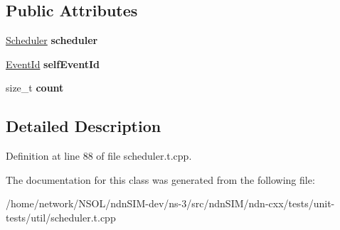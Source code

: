 \subsection*{Public Attributes}
\begin{DoxyCompactItemize}
\item 
\hyperlink{classndn_1_1util_1_1scheduler_1_1Scheduler}{Scheduler} {\bfseries scheduler}\hypertarget{classndn_1_1util_1_1scheduler_1_1tests_1_1SelfRescheduleFixture_a22e0eb1d7ebe87b27ef55a4a594a9df4}{}\label{classndn_1_1util_1_1scheduler_1_1tests_1_1SelfRescheduleFixture_a22e0eb1d7ebe87b27ef55a4a594a9df4}

\item 
\hyperlink{classEventId}{Event\+Id} {\bfseries self\+Event\+Id}\hypertarget{classndn_1_1util_1_1scheduler_1_1tests_1_1SelfRescheduleFixture_a54fac009a656161ffcb7bdaf8094e071}{}\label{classndn_1_1util_1_1scheduler_1_1tests_1_1SelfRescheduleFixture_a54fac009a656161ffcb7bdaf8094e071}

\item 
size\+\_\+t {\bfseries count}\hypertarget{classndn_1_1util_1_1scheduler_1_1tests_1_1SelfRescheduleFixture_ad51d0228168ff187634aa106d56bb520}{}\label{classndn_1_1util_1_1scheduler_1_1tests_1_1SelfRescheduleFixture_ad51d0228168ff187634aa106d56bb520}

\end{DoxyCompactItemize}


\subsection{Detailed Description}


Definition at line 88 of file scheduler.\+t.\+cpp.



The documentation for this class was generated from the following file\+:\begin{DoxyCompactItemize}
\item 
/home/network/\+N\+S\+O\+L/ndn\+S\+I\+M-\/dev/ns-\/3/src/ndn\+S\+I\+M/ndn-\/cxx/tests/unit-\/tests/util/scheduler.\+t.\+cpp\end{DoxyCompactItemize}
